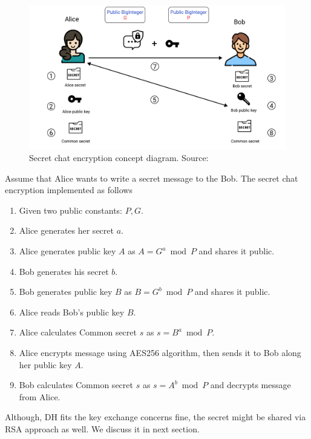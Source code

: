 \begin{figure}[H]
    \centering
    \includegraphics[width=1\textwidth]{Pictures/Key_Exchange}
    \caption{Secret chat encryption concept diagram. Source: }\label{fig:figure7}
\end{figure}
Assume that Alice wants to write a secret message to the Bob.
The secret chat encryption implemented as follows
\begin{enumerate}
    \item Given two public constants: $P, G$.
    \item Alice generates her secret $a$.
    \item Alice generates public key $A$ as $A=G^a \bmod P$ and shares it public.
    \item Bob generates his secret $b$.
    \item Bob generates public key $B$ as $B=G^b \bmod P$ and shares it public.
    \item Alice reads Bob's public key $B$.
    \item Alice calculates Common secret $s$ as $s = B^a \bmod P$.
    \item Alice encrypts message using AES256 algorithm, then sends it to Bob along her public key $A$.
    \item Bob calculates Common secret $s$ as $s = A^b \bmod P$ and decrypts message from Alice.
\end{enumerate}
Although, DH fits the key exchange concerns fine, the secret might be shared via RSA approach as well.
We discuss it in next section.